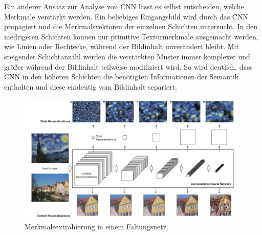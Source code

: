 \documentclass[times, 11pt,twocolumn]{article}
\begin{document}
Ein anderer Ansatz zur Analyse von CNN lässt es selbst entscheiden, welche Merkmale verstärkt werden. Ein beliebiges Eingangsbild wird durch das CNN propagiert und die Merkmalsvektoren der einzelnen Schichten untersucht. In den niedrigeren Schichten können nur primitive Texturmerkmale ausgemacht werden, wie Linien oder Rechtecke, während der Bildinhalt unverändert bleibt. Mit steigender Schichtanzahl werden die verstärkten Muster immer komplexer  und größer während der Bildinhalt teilweise modifiziert wird. So wird deutlich, dass CNN in den höheren Schichten die benötigten Informationen der Semantik enthalten und diese eindeutig vom Bildinhalt separiert.\\
\begin{figure}
	\flushleft
	\includegraphics[width=\columnwidth]{Bilder/StyleRepesentation.JPG}
	\caption{Merkmalsextrahierung in einem Faltungsnetz\cite{GatysEB15a}.}
	\label{fig:StyleRepresenation}
\end{figure}
\end{document}
